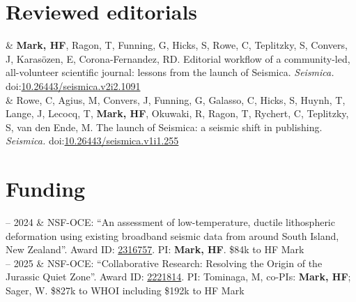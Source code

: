 \documentclass[10pt, letterpaper]{article}
\newcommand{\LastName}{Mark}
\newcommand{\Initials}{HF}  %
\newcommand{\Me}{\textbf{\LastName, \Initials}}  %
\newcommand{\danl}{Lizarralde, D}
\newcommand{\Doug}{Wiens, DA}
\newcommand{\Masako}{Tominaga, M}
\newcommand{\WSage}{Sager, W}
\newcommand{\CRowe}{Rowe, C}
\newcommand{\MAgi}{Agius, M}
\newcommand{\JConv}{Convers, J}
\newcommand{\GFun}{Funning, G}
\newcommand{\CGal}{Galasso, C}
\newcommand{\SHic}{Hicks, S}
\newcommand{\THuy}{Huynh, T}
\newcommand{\JLan}{Lange, J}
\newcommand{\TLec}{Lecocq, T}
\newcommand{\ROku}{Okuwaki, R}
\newcommand{\Thea}{Ragon, T}
\newcommand{\CRyc}{Rychert, C}
\newcommand{\STep}{Teplitzky, S}
\newcommand{\MvdE}{van den Ende, M}
\newcommand{\EKar}{Karasözen, E}
\newcommand{\RDCF}{Corona-Fernandez, RD}
\newcommand{\DOI}[1]{doi:\href{https://doi.org/#1}{#1}}
\newcommand{\Duration}[2]{\fontsize{9pt}{0}\selectfont #1 -- #2}
\newcommand{\Year}[1]{\fontsize{9pt}{0}\selectfont #1}
\begin{document}
\section{Reviewed editorials}

\begin{EntriesTable}
\Year{2023}  &
  \Me, \Thea, \GFun, \SHic, \CRowe, \STep, \JConv, \EKar, \RDCF.
  Editorial workflow of a community-led, all-volunteer scientific journal: lessons from the launch of Seismica.
  \emph{Seismica.}
  \DOI{10.26443/seismica.v2i2.1091} \\
\Year{2022}  &
  \CRowe, \MAgi, \JConv, \GFun, \CGal, \SHic, \THuy, \JLan, \TLec, \Me, \ROku, \Thea, \CRyc, \STep, \MvdE. 
  The launch of Seismica: a seismic shift in publishing. 
  \emph{Seismica.}
  \DOI{10.26443/seismica.v1i1.255}
\end{EntriesTable}



%



\section{Funding}

\begin{EntriesTable}
  \Duration{2023}{2024}  &
  NSF-OCE: ``An assessment of low-temperature, ductile lithospheric deformation using existing broadband seismic data from around South Island, New Zealand''. \newline
  Award ID: \href{https://www.nsf.gov/awardsearch/showAward?AWD_ID=2316757}{2316757}.
  PI: \Me. \newline
  \small \$84k to HF Mark
  \\
  \Duration{2023}{2025}  &
  NSF-OCE: ``Collaborative Research: Resolving the Origin of the Jurassic Quiet Zone''. \newline
  Award ID: \href{https://www.nsf.gov/awardsearch/showAward?AWD_ID=2221814}{2221814}.
  PI: \Masako, co-PIs: \Me; \WSage. \newline
  \small \$827k to WHOI including \$192k to HF Mark
\end{EntriesTable}
\end{document}
